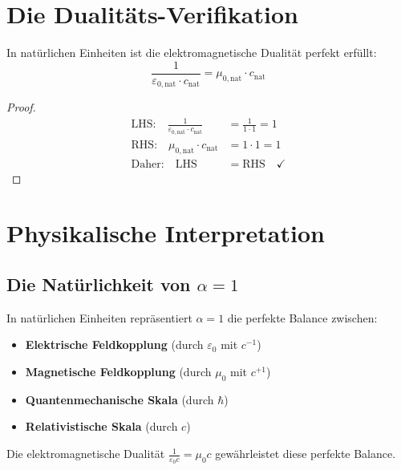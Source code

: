 	\section{Die Dualitäts-Verifikation}
	
	\begin{theorem}
		In natürlichen Einheiten ist die elektromagnetische Dualität perfekt erfüllt:
		\begin{equation}
			\frac{1}{\varepsilon_{0,\text{nat}} \cdot c_{\text{nat}}} = \mu_{0,\text{nat}} \cdot c_{\text{nat}}
		\end{equation}
	\end{theorem}
	
	\begin{proof}
		\begin{align}
			\text{LHS:} \quad \frac{1}{\varepsilon_{0,\text{nat}} \cdot c_{\text{nat}}} &= \frac{1}{1 \cdot 1} = 1\\
			\text{RHS:} \quad \mu_{0,\text{nat}} \cdot c_{\text{nat}} &= 1 \cdot 1 = 1\\
			\text{Daher:} \quad \text{LHS} &= \text{RHS} \quad \checkmark
		\end{align}
	\end{proof}
	
	\section{Physikalische Interpretation}
	
	\subsection{Die Natürlichkeit von $\alpha = 1$}
	
	\begin{tcolorbox}[colback=green!5!white,colframe=green!75!black,title=Wichtige physikalische Erkenntnis]
		In natürlichen Einheiten repräsentiert $\alpha = 1$ die perfekte Balance zwischen:
		\begin{itemize}
			\item \textbf{Elektrische Feldkopplung} (durch $\varepsilon_0$ mit $c^{-1}$)
			\item \textbf{Magnetische Feldkopplung} (durch $\mu_0$ mit $c^{+1}$)
			\item \textbf{Quantenmechanische Skala} (durch $\hbar$)
			\item \textbf{Relativistische Skala} (durch $c$)
		\end{itemize}
		
		Die elektromagnetische Dualität $\frac{1}{\varepsilon_0 c} = \mu_0 c$ gewährleistet diese perfekte Balance.
	\end{tcolorbox}
	
